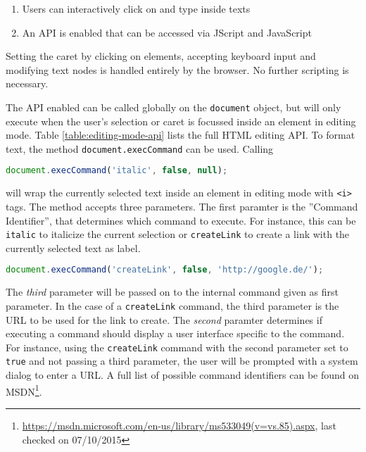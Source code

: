 \begin{enumerate} \item Users can interactively click on and type inside texts \item An API is enabled that can be accessed via JScript and JavaScript\end{enumerate}

Setting the caret by clicking on elements, accepting keyboard input and modifying text nodes is handled entirely by the browser. No further scripting is necessary.

The API enabled can be called globally on the \texttt{document} object, but will only execute when the user's selection or caret is focussed inside an element in editing mode. Table \ref{table:editing-mode-api} lists the full HTML editing API. To format text, the method \texttt{document.execCommand} can be used. Calling

\begin{lstlisting}[language=JavaScript, caption=Emphasizing text using the HTML editing API, label=lst:execcommand-italics]
document.execCommand('italic', false, null);
\end{lstlisting}

\noindent will wrap the currently selected text inside an element in editing mode with \texttt{<i>} tags. The method accepts three parameters. The first paramter is the ''Command Identifier'', that determines which command to execute. For instance, this can be \texttt{italic} to italicize the current selection or \texttt{createLink} to create a link with the currently selected text as label.

\begin{lstlisting}[language=JavaScript, caption=Creating a link using the HTML editing API, label=lst:execcommand-link]
document.execCommand('createLink', false, 'http://google.de/');
\end{lstlisting}

The \textit{third} parameter will be passed on to the internal command given as first parameter. In the case of a \texttt{createLink} command, the third parameter is the URL to be used for the link to create. The \textit{second} paramter determines if executing a command should display a user interface specific to the command. For instance, using the \texttt{createLink} command with the second parameter set to \texttt{true} and not passing a third parameter, the user will be prompted with a system dialog to enter a URL. A full list of possible command identifiers can be found on MSDN\footnote{\url{https://msdn.microsoft.com/en-us/library/ms533049(v=vs.85).aspx}, last checked on 07/10/2015}.

